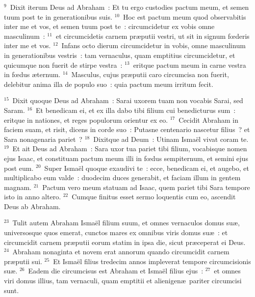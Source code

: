 ${}^{9}$~Dixit iterum Deus ad Abraham~: Et tu ergo custodies pactum meum, et semen tuum post te in generationibus suis.
${}^{10}$~Hoc est pactum meum quod observabitis inter me et vos, et semen tuum post te~: circumcidetur ex vobis omne masculinum~:
${}^{11}$~et circumcidetis carnem pr\ae putii vestri, ut sit in signum fœderis inter me et vos.
${}^{12}$~Infans octo dierum circumcidetur in vobis, omne masculinum in generationibus vestris~: tam vernaculus, quam emptitius circumcidetur, et quicumque non fuerit de stirpe vestra~:
${}^{13}$~eritque pactum meum in carne vestra in fœdus \ae ternum.
${}^{14}$~Masculus, cujus pr\ae putii caro circumcisa non fuerit, delebitur anima illa de populo suo~: quia pactum meum irritum fecit.


${}^{15}$~Dixit quoque Deus ad Abraham~: Sarai uxorem tuam non vocabis Sarai, sed Saram.
${}^{16}$~Et benedicam ei, et ex illa dabo tibi filium cui benedicturus sum~: eritque in nationes, et reges populorum orientur ex eo.
${}^{17}$~Cecidit Abraham in faciem suam, et risit, dicens in corde suo~: Putasne centenario nascetur filius~? et Sara nonagenaria pariet~?
${}^{18}$~Dixitque ad Deum~: Utinam Isma\"el vivat coram te.
${}^{19}$~Et ait Deus ad Abraham~: Sara uxor tua pariet tibi filium, vocabisque nomen ejus Isaac, et constituam pactum meum illi in fœdus sempiternum, et semini ejus post eum.
${}^{20}$~Super Isma\"el quoque exaudivi te~: ecce, benedicam ei, et augebo, et multiplicabo eum valde~: duodecim duces generabit, et faciam illum in gentem magnam.
${}^{21}$~Pactum vero meum statuam ad Isaac, quem pariet tibi Sara tempore isto in anno altero.
${}^{22}$~Cumque finitus esset sermo loquentis cum eo, ascendit Deus ab Abraham.


${}^{23}$~Tulit autem Abraham Isma\"el filium suum, et omnes vernaculos domus su\ae , universosque quos emerat, cunctos mares ex omnibus viris domus su\ae~: et circumcidit carnem pr\ae putii eorum statim in ipsa die, sicut pr\ae ceperat ei Deus.
${}^{24}$~Abraham nonaginta et novem erat annorum quando circumcidit carnem pr\ae putii sui.
${}^{25}$~Et Isma\"el filius tredecim annos impleverat tempore circumcisionis su\ae .
${}^{26}$~Eadem die circumcisus est Abraham et Isma\"el filius ejus~:
${}^{27}$~et omnes viri domus illius, tam vernaculi, quam emptitii et alienigen\ae\ pariter circumcisi sunt.

